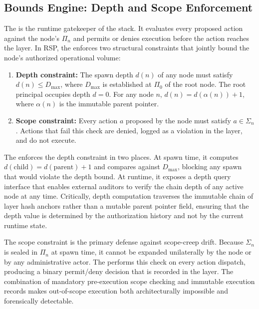 \subsection{Bounds Engine: Depth and Scope Enforcement}

The \bounds is the runtime gatekeeper of the \bxthree stack. It evaluates every proposed action against the node's $\Pi_n$ and permits or denies execution before the action reaches the \fact layer. In RSP, the \bounds enforces two structural constraints that jointly bound the node's authorized operational volume:

\begin{enumerate}
    \setlength\itemsep{0.4em}
    \item \textbf{Depth constraint:} The spawn depth $d(n)$ of any node must satisfy $d(n) \leq D_{\max}$, where $D_{\max}$ is established at $\Pi_0$ of the root node. The root principal occupies depth $d = 0$. For any node $n$, $d(n) = d(\alpha(n)) + 1$, where $\alpha(n)$ is the immutable parent pointer.
    \item \textbf{Scope constraint:} Every action $a$ proposed by the node must satisfy $a \in \Sigma_n$. Actions that fail this check are denied, logged as a \bounds violation in the \fact layer, and do not execute.
\end{enumerate}

The \bounds enforces the depth constraint in two places. At spawn time, it computes $d(\text{child}) = d(\text{parent}) + 1$ and compares against $D_{\max}$, blocking any spawn that would violate the depth bound. At runtime, it exposes a depth query interface that enables external auditors to verify the chain depth of any active node at any time. Critically, depth computation traverses the immutable chain of \purpose layer hash anchors rather than a mutable parent pointer field, ensuring that the depth value is determined by the authorization history and not by the current runtime state.

The scope constraint is the primary defense against scope-creep drift. Because $\Sigma_n$ is sealed in $\Pi_n$ at spawn time, it cannot be expanded unilaterally by the node or by any administrative actor. The \bounds performs this check on every action dispatch, producing a binary permit/deny decision that is recorded in the \fact layer. The combination of mandatory pre-execution scope checking and immutable execution records makes out-of-scope execution both architecturally impossible and forensically detectable.

